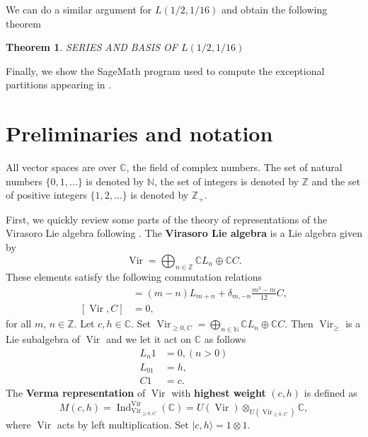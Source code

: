 \documentclass[12pt, a4paper]{article}
\newtheorem{theorem}{Theorem}
\DeclareMathOperator{\Vir}{Vir}
\DeclareMathOperator{\Ind}{Ind}
\begin{document}
We can do a similar argument for $L(1/2, 1/16)$ and obtain the following theorem

\begin{theorem}
  \label{thr:5}
  SERIES AND BASIS OF $L(1/2,1/16)$
\end{theorem}

Finally, we show the SageMath program used to compute the exceptional partitions appearing in .

\section{Preliminaries and notation}
\label{sec:prel-notat}
All vector spaces are over $\mathbb{C}$, the field of complex numbers.
The set of natural numbers $\{0, 1, \dots\}$ is denoted by $\mathbb{N}$, the set of integers is denoted by $\mathbb{Z}$ and the set of positive integers $\{1, 2, \dots\}$ is denoted by $\mathbb{Z}_+$.

First, we quickly review some parts of the theory of representations of the Virasoro Lie algebra following \cite{kac_bombay_2013}.
The \textbf{Virasoro Lie algebra} is a Lie algebra given by
\begin{equation*}
  \Vir = \bigoplus_{n \in \mathbb{Z}}\mathbb{C}L_n \oplus \mathbb{C}C.
\end{equation*}
These elements satisfy the following commutation relations
\begin{align*}
  [L_m, L_n] &= (m - n)L_{m + n} + \delta_{m, -n}\frac{m^3 -m}{12}C, \\
  [\Vir, C] &= 0, 
\end{align*}
for all $m$, $n \in \mathbb{Z}$.
Let $c, h \in \mathbb{C}$.
Set $\Vir_{\ge 0, C} = \bigoplus_{n \in \mathbb{N}}\mathbb{C}L_n \oplus \mathbb{C}C$.
Then $\Vir_\ge$ is a Lie subalgebra of $\Vir$ and we let it act on $\mathbb{C}$ as follows
\begin{align*}
  L_n1 &= 0, (n>0) \\
  L_01 &= h, \\
  C1 &= c.
\end{align*}
The \textbf{Verma representation} of $\Vir$ with \textbf{highest weight} $(c, h)$ is defined as 
\begin{equation*}
  M(c, h) = \Ind^{\Vir}_{\Vir_{\ge 0, C}}(\mathbb{C}) = U(\Vir) \otimes_{U(\Vir_{\ge 0, C})} \mathbb{C},
\end{equation*}
where $\Vir$ acts by left multiplication.
Set $|c, h\rangle = 1 \otimes 1$.
\end{document}
